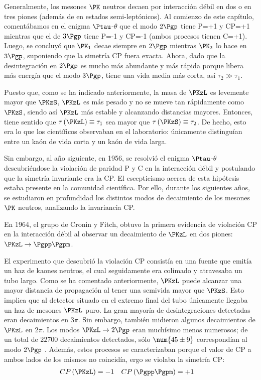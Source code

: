 Generalmente, los mesones $\PK$ neutros decaen por interacción débil en dos o en tres piones (además de en estados semi-leptónicos). Al comienzo de este capítulo, comentábamos en el enigma $\Ptau$-$\theta$ que el modo $2\Pgp$ tiene P=+1 y CP=+1 mientras que el de $3\Pgp$ tiene P=-1 y CP=-1 (ambos procesos tienen C=+1). Luego, se concluyó que $\PK_{1}$ decae siempre en $2\Pgp$ mientras $\PK_{2}$ lo hace en $3\Pgp$, suponiendo que la simetría CP fuera exacta. Ahora, dado que la desintegración en $2\Pgp$ es mucho más abundante y más rápida porque libera más energía que el modo $3\Pgp$, tiene una vida media más corta, así $\tau_{2} \gg \tau_{1}$. 

Puesto que, como se ha indicado anteriormente, la masa de $\PKzL$ es levemente mayor que $\PKzS$, $\PKzL$ es más pesado y no se mueve tan rápidamente como $\PKzS$, siendo así $\PKzL$ más estable y alcanzando distancias mayores. Entonces, tiene sentido que $\tau\left(\PKzL\right)\equiv \tau_{1}$ sea mayor que $\tau\left(\PKzS\right) \equiv \tau_{2}$. De hecho, esto era lo que los científicos observaban en el laboratorio: únicamente distinguían entre un kaón de vida corta y un kaón de vida larga.

Sin embargo, al año siguiente, en 1956, se resolvió el enigma $\Ptau$-$\theta$ descubriéndose la violación de paridad P y C en la interacción débil y postulando que la simetría invariante era la CP. El escepticismo acerca de esta hipótesis estaba presente en la comunidad científica. Por ello, durante los siguientes años, se estudiaron en profundidad los distintos modos de decaimiento de los mesones $\PK$ neutros, analizando la invariancia CP.

En 1964, el grupo de Cronin y Fitch, obtuvo la primera evidencia de violación CP en la interacción débil al observar un decaimiento de $\PKzL$ en dos piones: $\PKzL \rightarrow \Pgpp\Pgpm$.

El experimento que descubrió la violación CP consistía en una fuente que emitía un haz de kaones neutros, el cual seguidamente era colimado y atravesaba un tubo largo. Como se ha comentado anteriormente, $\PKzL$ puede alcanzar una mayor distancia de propagación al tener una semivida mayor que $\PKzS$. Esto implica que al detector situado en el extremo final del tubo únicamente llegaba un haz de mesones $\PKzL$ puro. La gran mayoría de desintegraciones detectadas eran decaimientos en $3\pi$. Sin embargo, también midieron algunos decaimientos de $\PKzL$ en $2\pi$. Los modos $\PKzL \rightarrow 2\Pgp$ eran muchísimo menos numerosos; de un total de $\num{22700}$ decaimientos detectados, sólo $\num{45 \pm 9}$ correspondían al modo $2\Pgp$ \cite{Cronin}. Además, estos procesos se caracterizaban porque el valor de CP a ambos lados de los mismos no coincidía, ergo se violaba la simetría CP:
\begin{align}
CP\left(\PKzL\right) &=-1 & CP\left(\Pgpp\Pgpm\right) &= +1
\end{align}

